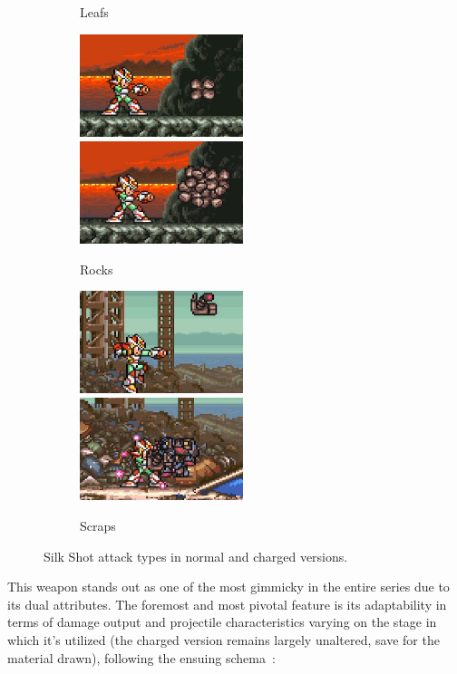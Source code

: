 \begin{figure}[htp]
\begin{subfigure}{\linewidth}
		\caption{Leafs}
	\end{subfigure}
	\begin{subfigure}{\linewidth}
		\centering
		\includegraphics[height=3cm]{figures/X2/weapons/S_shot_5.png}	
		\includegraphics[height=3cm]{figures/X2/weapons/S_shot_6.png}	
		\caption{Rocks}	
	\end{subfigure}
	\begin{subfigure}{\linewidth}
		\centering
		\includegraphics[height=3cm]{figures/X2/weapons/S_shot_7.png}	
		\includegraphics[height=3cm]{figures/X2/weapons/S_shot_8.png}	
		\caption{Scraps}
	\end{subfigure}
	\caption{Silk Shot attack types in normal and charged versions.}
\end{figure}
This weapon stands out as one of the most gimmicky in the entire series due to its dual attributes. The foremost and most pivotal feature is its adaptability in terms of damage output and projectile characteristics varying on the stage in which it's utilized (the charged version remains largely unaltered, save for the material drawn), following the ensuing schema~\cite{wiki:Silk_shot}:
